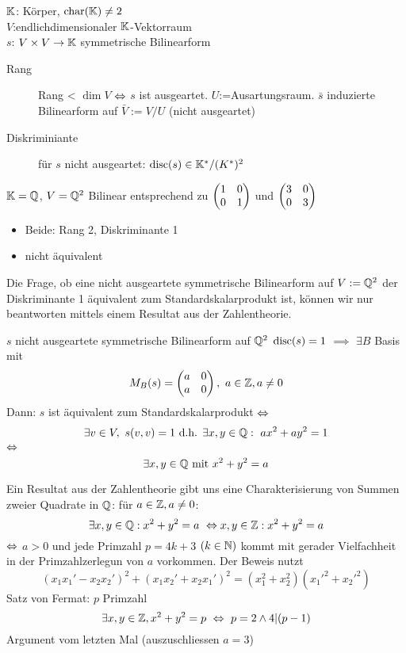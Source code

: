 \begin{Faz}
  $\mathbb{K}$: Körper, $\text{char}(\mathbb{K})\neq 2$\\
  $V$:endlichdimensionaler $\mathbb{K}$-Vektorraum\\
  $s$: $V\times V\to\mathbb{K}$ symmetrische Bilinearform
  \begin{description}
    \item[Rang] Rang < $\dim V$ $\Leftrightarrow$ $s$ ist ausgeartet. $U$:=Ausartungsraum. $\bar s$ induzierte Bilinearform auf $\bar V:=V/U$ (nicht ausgeartet)
    \item[Diskriminiante] für $s$ nicht ausgeartet: $\operatorname{disc}(s)\in\mathbb{K}^*/(K^*)^2$
  \end{description}
\end{Faz}
\begin{Bsp}
  $\mathbb{K}=\mathbb{Q}$, $V=\mathbb{Q}^2$ Bilinear entsprechend zu $\begin{pmatrix}1&0\\0&1\end{pmatrix}$ und $\begin{pmatrix}3&0\\0&3\end{pmatrix}$
  \begin{itemize}
    \item Beide: Rang 2, Diskriminante 1
    \item nicht äquivalent
  \end{itemize}
\end{Bsp}
\begin{Bem}
  Die Frage, ob eine nicht ausgeartete symmetrische Bilinearform auf $V:=\mathbb{Q}^2$ der Diskriminante 1 äquivalent zum Standardskalarprodukt ist, können wir nur beantworten mittels einem Resultat aus der Zahlentheorie.
\end{Bem}
\begin{Sat}
  $s$ nicht ausgeartete symmetrische Bilinearform auf $\mathbb{Q}^2$ $\operatorname{disc}(s)=1$ $\implies$ $\exists B$ Basis mit
  \[M_B(s)=\Mx{a&0\\a&0},\ a\in\mb{Z},a\neq 0\]
  Dann: $s$ ist äquivalent zum Standardskalarprodukt $\Leftrightarrow$
  \[\exists v\in V,\ s(v,v)=1\text{ d.h. }\exists x,y\in\mb{Q}:\ ax^2+ay^2=1\]
  $\Leftrightarrow$
  \[\exists x,y\in\mathbb{Q}\text{ mit }x^2+y^2=a\]
\end{Sat}
\begin{Bem}
  Ein Resultat aus der Zahlentheorie gibt uns eine Charakterisierung von Summen zweier Quadrate in $\mathbb{Q}$: für $a\in\mathbb{Z},a\neq 0$:
  \[\exists x,y\in\mathbb{Q}:x^2+y^2=a\ \Leftrightarrow x,y\in\mathbb{Z}:x^2+y^2=a\]
  $\Leftrightarrow$ $a>0$ und jede Primzahl $p=4k+3$ $(k\in\mathbb{N})$ kommt mit gerader Vielfachheit in der Primzahlzerlegun von $a$ vorkommen. Der Beweis nutzt
  \[(x_1x_1'-x_2x_2')^2+(x_1x_2'+x_2x_1')^2=(x_1^2+x_2^2)(x_1'^2+x_2'^2)\]
  Satz von Fermat: $p$ Primzahl 
  \[\exists x,y\in\mb{Z},x^2+y^2=p\ \Lra\ p=2\wedge 4|(p-1)\]
  Argument vom letzten Mal (auszuschliessen $a=3$)
\end{Bem}
